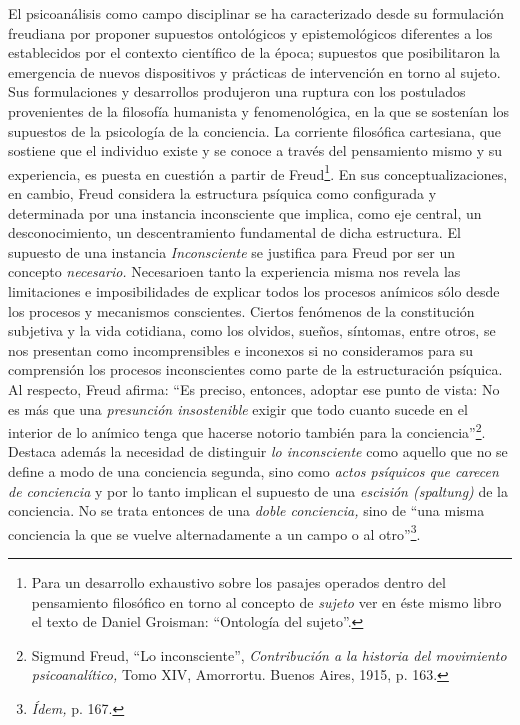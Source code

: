El psicoanálisis como campo disciplinar se ha caracterizado desde su formulación freudiana por proponer supuestos ontológicos y epistemológicos diferentes a los establecidos por el contexto científico de la época; supuestos que posibilitaron la emergencia de nuevos dispositivos y prácticas de intervención en torno al sujeto. Sus formulaciones y desarrollos produjeron una ruptura con los postulados provenientes de la filosofía humanista y fenomenológica, en la que se sostenían los supuestos de la psicología de la conciencia. La corriente filosófica cartesiana, que sostiene que el individuo existe y se conoce a través del pensamiento mismo y su experiencia, es puesta en cuestión a partir de Freud\footnote{Para un desarrollo exhaustivo sobre los pasajes operados dentro del pensamiento filosófico en torno al concepto de \emph{sujeto} ver en éste mismo libro el texto de Daniel Groisman: \enquote{Ontología del sujeto}.}. En sus conceptualizaciones, en cambio, Freud considera la estructura psíquica como configurada y determinada por una instancia inconsciente que implica, como eje central, un desconocimiento, un descentramiento fundamental de dicha estructura. El supuesto de una instancia \emph{Inconsciente} se justifica para Freud por ser un concepto \emph{necesario.} Necesarioen tanto la experiencia misma nos revela las limitaciones e imposibilidades de explicar todos los procesos anímicos sólo desde los procesos y mecanismos conscientes. Ciertos fenómenos de la constitución subjetiva y la vida cotidiana, como los olvidos, sueños, síntomas, entre otros, se nos presentan como incomprensibles e inconexos si no consideramos para su comprensión los procesos inconscientes como parte de la estructuración psíquica. Al respecto, Freud afirma: \enquote{Es preciso, entonces, adoptar ese punto de vista: No es más que una \emph{presunción insostenible} exigir que todo cuanto sucede en el interior de lo anímico tenga que hacerse notorio también para la conciencia}\footnote{Sigmund Freud, \enquote{Lo inconsciente}, \emph{Contribución a la historia del movimiento psicoanalítico,} Tomo XIV, Amorrortu. Buenos Aires, 1915, p. 163.}. Destaca además la necesidad de distinguir \emph{lo inconsciente} como aquello que no se define a modo de una conciencia segunda, sino como \emph{actos psíquicos que carecen de conciencia} y por lo tanto implican el supuesto de una \emph{escisión (spaltung)} de la conciencia. No se trata entonces de una \emph{doble conciencia,} sino de \enquote{una misma conciencia la que se vuelve alternadamente a un campo o al otro}\footnote{\emph{Ídem,} p. 167.}.

